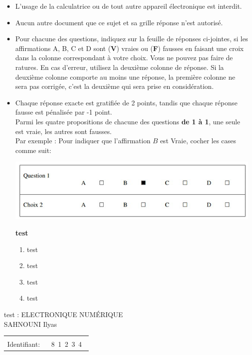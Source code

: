\documentclass{book}%
\begin{document}
\begin{itemize}%
\item%
L'usage de la calculatrice ou de tout autre appareil électronique est interdit.%
\item%
Aucun autre document que ce sujet et sa grille réponse n'est autorisé.%
\item%
Pour chacune des questions, indiquez sur la feuille de réponses ci-jointes, si les affirmations A, B, C et D sont (\textbf{V}) vraies ou (\textbf{F}) fausses en faisant une croix dans la colonne correspondant à votre choix. Vous ne pouvez pas faire de ratures. En cas d'erreur, utilisez la deuxième colonne de réponse. Si la deuxième colonne comporte au moins une réponse, la première colonne ne sera pas corrigée, c'est la deuxième qui sera prise en considération.%
\item%
Chaque réponse exacte est gratifiée de 2 points, tandis que chaque réponse fausse est pénalisée par -1 point. \\ 	Parmi les quatre propositions de chacune des questions \textbf{de 1 à 1}, une seule est vraie, les autres sont fausses. \\ 	Par exemple : Pour indiquer que l'affirmation $B$ est Vraie, cocher les cases comme suit:  \\ \begin{center}	\includegraphics[scale=0.8]{reponses.png} \end{center}%
\thispagestyle{empty}%
\begin{exercise}%
\textbf{test }%
\begin{enumerate}[label=\textbf{\Alph*. }]%
\item%
test%
\item%
test%
\item%
test%
\item%
test%
\end{enumerate}%
\end{exercise}%
\end{itemize}%
\newpage%
\thispagestyle{empty}%
test : ELECTRONIQUE NUMÉRIQUE $\qquad \qquad \qquad \qquad \qquad \qquad \qquad \qquad$ SAHNOUNI Ilyas%
\begin{flushright}%
\begin{tabular}{|l|}%
\hline%
 \\%
\thispagestyle{empty}%
Identifiant: $\quad$ {\Large 8~1~2~3~4~}%
 \\%
\hline%
\end{tabular}%
\end{flushright}%
\end{document}
